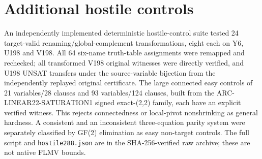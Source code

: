 \documentclass[11pt]{article}
\begin{document}
\section{Additional hostile controls}
An independently implemented deterministic hostile-control suite tested 24 target-valid renaming/global-complement transformations, eight each on Y6, U198 and V198. All 64 six-name truth-table assignments were remapped and rechecked; all transformed V198 original witnesses were directly verified, and U198 UNSAT transfers under the source-variable bijection from the independently replayed original certificate. The large connected easy controls of 21 variables/28 clauses and 93 variables/124 clauses, built from the ARC-LINEAR22-SATURATION1 signed exact-(2,2) family, each have an explicit verified witness. This rejects connectedness or local-pivot nonshrinking as general hardness. A consistent and an inconsistent three-equation parity system were separately classified by GF(2) elimination as easy non-target controls. The full script and \texttt{hostile288.json} are in the SHA-256-verified raw archive; these are not native FLMV bounds.
\end{document}
